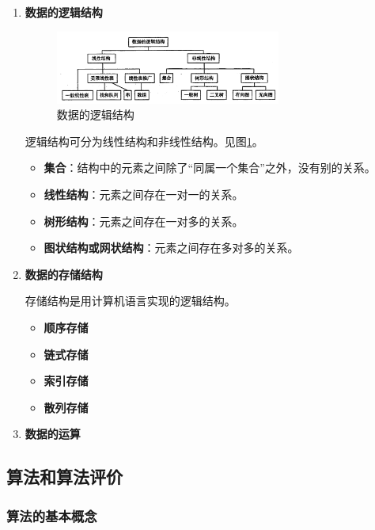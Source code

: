 \documentclass[12pt, a4paper, oneside]{ctexart}
\begin{document}
\begin{enumerate}
  \item {\bf 数据的逻辑结构}
  
  \begin{figure}[h]
    \centering
    \includegraphics[width=0.7\textwidth]{./images/logical-structure.png}
    \caption{数据的逻辑结构}
    \label{logical-structure}
  \end{figure}
  
  逻辑结构可分为线性结构和非线性结构。见图\ref{logical-structure}。

  \begin{itemize}
    \item {\bf 集合}：结构中的元素之间除了“同属一个集合”之外，没有别的关系。
    \item {\bf 线性结构}：元素之间存在一对一的关系。
    \item {\bf 树形结构}：元素之间存在一对多的关系。
    \item {\bf 图状结构或网状结构}：元素之间存在多对多的关系。
  \end{itemize}

  \item {\bf 数据的存储结构}
  
  存储结构是用计算机语言实现的逻辑结构。
  \begin{itemize}
    \item {\bf 顺序存储}
    \item {\bf 链式存储}
    \item {\bf 索引存储}
    \item {\bf 散列存储}
  \end{itemize}

  \item {\bf 数据的运算}
\end{enumerate}

\subsection{算法和算法评价}

\subsubsection{算法的基本概念}
\end{document}
